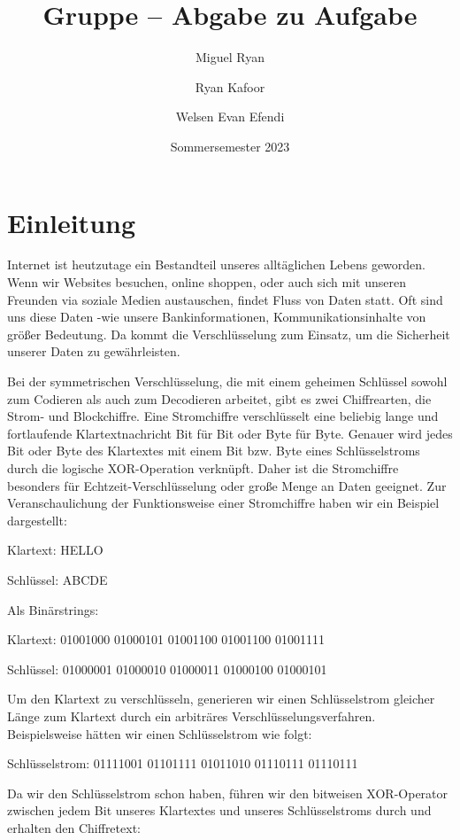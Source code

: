 \documentclass[course=erap]{aspdoc}
\author{Miguel Ryan \and Ryan Kafoor \and Welsen Evan Efendi}
\date{Sommersemester 2023} %
\title{Gruppe \theGroup{} -- Abgabe zu Aufgabe \theNumber}
\begin{document}
\maketitle
\section{Einleitung}
Internet ist heutzutage ein Bestandteil unseres alltäglichen Lebens geworden. 
Wenn wir Websites besuchen, online shoppen, oder auch sich mit unseren Freunden via soziale Medien austauschen, findet Fluss von Daten statt. Oft sind uns diese Daten -wie unsere Bankinformationen, Kommunikationsinhalte von größer Bedeutung. Da kommt die Verschlüsselung zum Einsatz, um die Sicherheit unserer Daten zu gewährleisten.


Bei der symmetrischen Verschlüsselung, die mit einem geheimen Schlüssel sowohl zum Codieren als 
auch zum Decodieren arbeitet, gibt es zwei Chiffrearten, die Strom- und Blockchiffre. 
Eine Stromchiffre verschlüsselt eine beliebig lange und fortlaufende Klartextnachricht Bit 
für Bit oder Byte für Byte. Genauer wird jedes Bit oder Byte des Klartextes mit einem Bit bzw. 
Byte eines Schlüsselstroms durch die logische XOR-Operation verknüpft. Daher ist die 
Stromchiffre besonders für Echtzeit-Verschlüsselung oder große Menge an Daten geeignet. Zur 
Veranschaulichung der Funktionsweise einer Stromchiffre haben wir ein Beispiel dargestellt: 

\begin{center}
Klartext: HELLO

Schlüssel: ABCDE
\end{center}

Als Binärstrings:

\begin{center}
Klartext: 01001000 01000101 01001100 01001100 01001111

Schlüssel: 01000001 01000010 01000011 01000100 01000101
\end{center}

Um den Klartext zu verschlüsseln, generieren wir einen Schlüsselstrom gleicher Länge zum Klartext 
durch ein arbiträres Verschlüsselungsverfahren. Beispielsweise hätten wir einen Schlüsselstrom wie 
folgt:

\begin{center}
Schlüsselstrom: 01111001 01101111 01011010 01110111 01110111
\end{center}

Da wir den Schlüsselstrom schon haben, führen wir den bitweisen XOR-Operator zwischen jedem Bit 
unseres Klartextes und unseres Schlüsselstroms durch und erhalten den Chiffretext:
\end{document}
